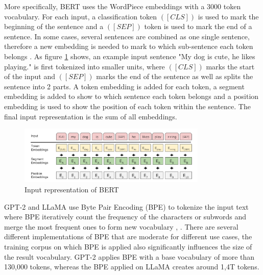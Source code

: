 \documentclass[runningheads]{llncs}
\begin{document}
\noindent \newline
More specifically, BERT uses the WordPiece embeddings \cite{Wu16} with a 3000 token vocabulary. For each input, a classification token $([CLS])$ is used to mark the beginning of the sentence and a $([SEP])$ token is
used to mark the end of a sentence. In some cases, several sentences are combined as one single sentence, therefore a new embedding is needed to mark to which sub-sentence each token belongs \cite{Devlin18}.
As figure \ref{fig:bert_input} shows, an example input sentence "My dog is cute, he likes playing." is first tokenized into smaller units, where $([CLS])$ marks the start of the input and 
$([SEP])$ marks the end of the sentence as well as splits the sentence into 2 parts. A token embedding is added for each token, a segment embedding is added to show to which sentence each token belongs and
a position embedding is used to show the position of each token within the sentence. The final input representation is the sum of all embeddings.
\begin{figure}[htbp]
  \centering
  \includegraphics[width=0.8\textwidth]{BERT input repres.png}
  \caption{Input representation of BERT \cite{Devlin18}}
  \label{fig:bert_input}
\end{figure}

\noindent \newline
GPT-2 and LLaMA use Byte Pair Encoding (BPE) \cite{Sennrich15} to tokenize the input text where BPE iteratively count the frequency of the characters or subwords and merge the most frequent ones
to form new vocabulary \cite{Radford19}, \cite{Touvron23}. There are several different implementations of BPE that are moderate for different use cases, the training corpus on which BPE is applied also
significantly influences the size of the result vocabulary. GPT-2 applies BPE with a base vocabulary of more than 130,000 tokens, whereas the BPE applied on LLaMA creates around 1,4T tokens.
\end{document}
